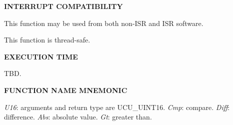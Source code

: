 \noindent\textbf{INTERRUPT COMPATIBILITY}
\begin{list}{}{\setlength{\leftmargin}{0.25in}\setlength{\topsep}{0.0in}}
\item This function may be used from both non-ISR and ISR software.
\item This function is thread-safe.
\end{list}
\vspace{2.8ex}

\noindent\textbf{EXECUTION TIME}
\begin{list}{}{\setlength{\leftmargin}{0.25in}\setlength{\topsep}{0.0in}}
\item TBD.
\end{list}
\vspace{2.8ex}

\noindent\textbf{FUNCTION NAME MNEMONIC}
\begin{list}{}{\setlength{\leftmargin}{0.25in}\setlength{\topsep}{0.0in}}
\item \emph{U16}:  arguments and return type are UCU\_UINT16.
      \emph{Cmp}: compare.
      \emph{Diff}:  difference.
      \emph{Abs}: absolute value.
      \emph{Gt}:  greater than.
\end{list}


